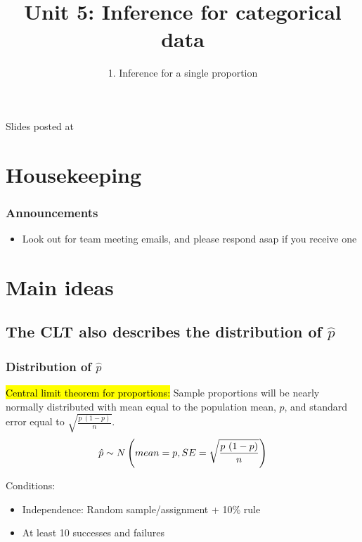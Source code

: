 \documentclass[slidestop,compress,mathserif,12pt,t,professionalfonts,xcolor=table]{beamer}
\title{Unit 5: Inference for categorical data}
\subtitle{1. Inference for a single proportion}
\author{\CourseName}
\date{}
\institute{\InstituteName}
\begin{document}



\begin{frame}[plain]

\titlepage

\vfill

{\scriptsize {} \hfill Slides posted at  \webURL{\CourseSite}}

\addtocounter{framenumber}{-1} 

\end{frame}


\section{Housekeeping}


\begin{frame}
\frametitle{Announcements}

\begin{itemize}

\item Look out for team meeting emails, and please respond asap if you receive one

\end{itemize}

\end{frame}


\section{Main ideas}


\subsection{The CLT also describes the distribution of $\hat{p}$}
\label{mi2}


\begin{frame}
\frametitle{Distribution of $\hat{p}$}

\hl{Central limit theorem for proportions:} Sample proportions will be nearly normally distributed with 
mean equal to the population mean, $p$, and standard error equal to $\sqrt{\frac{p~(1-p)}{n}}$.
\[ \hat{p} \sim N \left(  mean = p, SE = \sqrt{\frac{p~(1-p)}{n}}  \right) \]

Conditions:
\begin{itemize}
\item Independence: Random sample/assignment + 10\% rule
\item At least 10 successes and failures
\end{itemize}

\end{frame}
\end{document}
